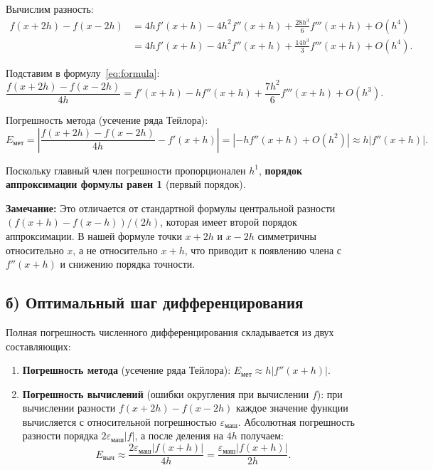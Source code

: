 \documentclass{article}
\begin{document}
Вычислим разность:
\begin{align}
f(x+2h) - f(x-2h) &= 4h f'(x+h) - 4h^2 f''(x+h) + \frac{28h^3}{6} f'''(x+h) + O(h^4) \nonumber \\
&= 4h f'(x+h) - 4h^2 f''(x+h) + \frac{14h^3}{3} f'''(x+h) + O(h^4).
\end{align}

Подставим в формулу~\eqref{eq:formula}:
\begin{equation}
\frac{f(x+2h) - f(x-2h)}{4h} = f'(x+h) - h f''(x+h) + \frac{7h^2}{6} f'''(x+h) + O(h^3).
\end{equation}

Погрешность метода (усечение ряда Тейлора):
\begin{equation}
E_{\text{мет}} = \left| \frac{f(x+2h) - f(x-2h)}{4h} - f'(x+h) \right| = \left| -h f''(x+h) + O(h^2) \right| \approx h |f''(x+h)|.
\end{equation}

Поскольку главный член погрешности пропорционален $h^1$, \textbf{порядок аппроксимации формулы равен 1} (первый порядок).

\textbf{Замечание:} Это отличается от стандартной формулы центральной разности $(f(x+h) - f(x-h))/(2h)$, которая имеет второй порядок аппроксимации. В нашей формуле точки $x+2h$ и $x-2h$ симметричны относительно $x$, а не относительно $x+h$, что приводит к появлению члена с $f''(x+h)$ и снижению порядка точности.

\subsection*{б) Оптимальный шаг дифференцирования}

Полная погрешность численного дифференцирования складывается из двух составляющих:
\begin{enumerate}
\item \textbf{Погрешность метода} (усечение ряда Тейлора): $E_{\text{мет}} \approx h |f''(x+h)|$.
\item \textbf{Погрешность вычислений} (ошибки округления при вычислении $f$): при вычислении разности $f(x+2h) - f(x-2h)$ каждое значение функции вычисляется с относительной погрешностью $\varepsilon_{\text{маш}}$. Абсолютная погрешность разности порядка $2\varepsilon_{\text{маш}} |f|$, а после деления на $4h$ получаем:
\begin{equation}
E_{\text{выч}} \approx \frac{2\varepsilon_{\text{маш}} |f(x+h)|}{4h} = \frac{\varepsilon_{\text{маш}} |f(x+h)|}{2h}.
\end{equation}
\end{enumerate}
\end{document}
